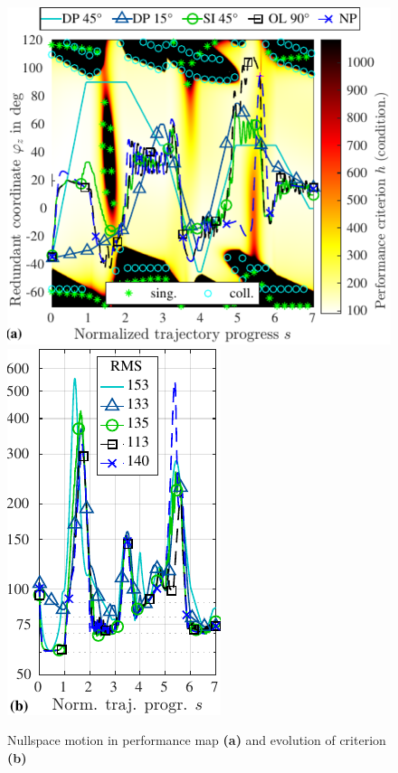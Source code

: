 \documentclass[runningheads]{llncs}
\begin{document}
\begin{figure}[tb]
\centering
\includegraphics{nullspace_traj1_compressed.pdf}
\includegraphics{nullspace_traj1_condition.pdf}
\caption{Nullspace motion in performance map \textbf{(a)} and evolution of criterion \textbf{(b)}}
\label{fig:eval_example1}
\end{figure}
\end{document}
